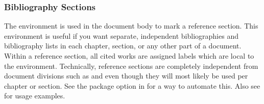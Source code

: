 \documentclass{ltxdockit}[2011/03/25]
\begin{document}
\begin{ltxexample}
\end{ltxexample}

\subsubsection{Bibliography Sections}
\label{use:bib:sec}

The  environment is used in the document body to mark a reference section. This environment is useful if you want separate, independent bibliographies and bibliography lists in each chapter, section, or any other part of a document. Within a reference section, all cited works are assigned labels which are local to the environment. Technically, reference sections are completely independent from document divisions such as  and  even though they will most likely be used per chapter or section. See the  package option in  for a way to automate this. Also see  for usage examples.
\end{document}
